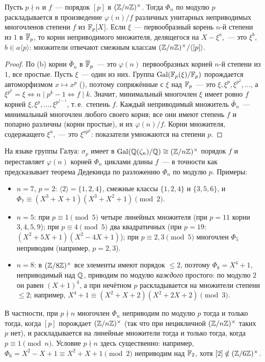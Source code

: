 \begin{proposition}
Пусть $p\nmid n$ и $f$~--- порядок $[p]$ в $(\mathbb Z/n\mathbb Z)^\times$. Тогда $\Phi_n$ по модулю $p$ раскладывается в произведение
$\varphi(n)/f$ различных унитарных неприводимых многочленов степени $f$ из $\mathbb F_p[X]$. Если $\xi$~--- первообразный корень
$n$-й степени из $1$ в $\overline{\mathbb F}_p$, то корни неприводимого множителя, делящегося на $X-\xi^a$,~--- это $\xi^{b}$, $b\in a\langle p\rangle$:
множители отвечают смежным классам $(\mathbb Z/n\mathbb Z)^\times/\langle[p]\rangle$.
\end{proposition}

\begin{proof}
По (b) корни $\bar\Phi_n$ в $\overline{\mathbb F}_p$~--- это $\varphi(n)$ первообразных корней $n$-й степени из $1$, все простые. Пусть
$\xi$~--- один из них. Группа $\operatorname{Gal}(\mathbb F_p(\xi)/\mathbb F_p)$ порождается автоморфизмом $x\mapsto x^p$ (), поэтому сопряжённые с $\xi$
над $\mathbb F_p$~--- это $\xi,\xi^p,\xi^{p^2},\dots$, а $\xi^{p^k}=\xi\iff n\mid p^k-1\iff f\mid k$. Значит, минимальный многочлен $\xi$
имеет ровно $f$ корней $\xi,\xi^p,\dots,\xi^{p^{f-1}}$, т.\,е.\ степень $f$. Каждый неприводимый множитель $\bar\Phi_n$~---
минимальный многочлен любого своего корня; все они имеют степень $f$ и попарно различны (корни простые), и их
$\varphi(n)/f$. Корни множителя, содержащего $\xi^a$,~--- это $\xi^{ap^k}$: показатели умножаются на степени $p$.
\end{proof}

На языке группы Галуа: $\sigma_p$ имеет в $\operatorname{Gal}(\mathbb Q(\zeta_n)/\mathbb Q)\cong(\mathbb Z/n\mathbb Z)^\times$ порядок $f$ и переставляет $\varphi(n)$ корней
$\Phi_n$ циклами длины $f$~--- в точности как предсказывает теорема Дедекинда  по разложению $\Phi_n$ по модулю $p$.
Примеры:
\begin{itemize}[leftmargin=*]
\item $n=7$, $p=2$: $\langle2\rangle=\{1,2,4\}$, смежные классы $\{1,2,4\}$ и $\{3,5,6\}$, и $\Phi_7\equiv(X^3+X+1)(X^3+X^2+1)\pmod2$.
\item $n=5$: при $p\equiv1\pmod5$ четыре линейных множителя (при $p=11$ корни $3,4,5,9$); при $p\equiv4\pmod5$ два
квадратичных (при $p=19$: $(X^2+5X+1)(X^2-4X+1)$); при $p\equiv2,3\pmod5$ многочлен $\Phi_5$ неприводим (например, $p=2,3$).
\item $n=8$: в $(\mathbb Z/8\mathbb Z)^\times$ все элементы имеют порядок $\le2$, поэтому $\Phi_8=X^4+1$, неприводимый над $\mathbb Q$, приводим по
модулю \emph{каждого} простого: по модулю $2$ он равен $(X+1)^4$, а при нечётном $p$ раскладывается на множители степени
$\le2$; например, $X^4+1\equiv(X^2+X+2)(X^2+2X+2)\pmod3$.
\end{itemize}
В частности, при $p\nmid n$ многочлен $\Phi_n$ неприводим по модулю $p$ тогда и только тогда, когда $[p]$ порождает
$(\mathbb Z/n\mathbb Z)^\times$ (так что при нецикличной $(\mathbb Z/n\mathbb Z)^\times$ таких $p$ нет), и раскладывается на линейные множители тогда и
только тогда, когда $p\equiv1\pmod n$. Условие $p\nmid n$ здесь существенно: например, $\Phi_6=X^2-X+1\equiv X^2+X+1\pmod2$
неприводим над $\mathbb F_2$, хотя $[2]\notin(\mathbb Z/6\mathbb Z)^\times$.

